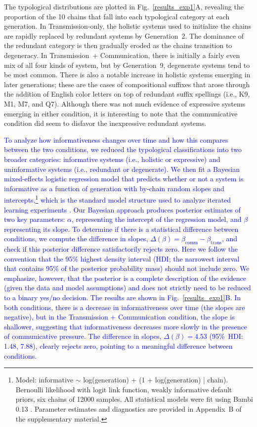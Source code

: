 \documentclass[doc,biblatex]{apa7}
\newcommand\newmaterial[1]{\textcolor{blue}{#1}}
\begin{document}
The typological distributions are plotted in Fig.~\ref{results_exp1}A, revealing the proportion of the 10 chains that fall into each typological category at each generation. In Transmission-only, the holistic systems used to initialize the chains are rapidly replaced by redundant systems by Generation~2. The dominance of the redundant category is then gradually eroded as the chains transition to degeneracy. In Transmission~+ Communication, there is initially a fairly even mix of all four kinds of system, but by Generation~9, degenerate systems tend to be most common. There is also a notable increase in holistic systems emerging in later generations; these are the cases of compositional suffixes that arose through the addition of English color letters on top of redundant suffix spellings (i.e., K9, M1, M7, and Q7). Although there was not much evidence of expressive systems emerging in either condition, it is interesting to note that the communicative condition did seem to disfavor the inexpressive redundant systems.

\newmaterial{To analyze how informativeness changes over time and how this compares between the two conditions, we reduced the typological classifications into two broader categories: informative systems (i.e., holistic or expressive) and uninformative systems (i.e., redundant or degenerate). We then fit a Bayesian mixed-effects logistic regression model that predicts whether or not a system is informative as a function of generation with by-chain random slopes and intercepts,\footnote{Model: informative $\sim$ log(generation) + (1 + log(generation) | chain). Bernoulli likelihood with logit link function, weakly informative default priors, six chains of 12000 samples. All statistical models were fit using Bambi 0.13 \parencite{Capretto:2022}. Parameter estimates and diagnostics are provided in Appendix~B of the supplementary material.} which is the standard model structure used to analyze iterated learning experiments \parencite{Winter:2016}. Our Bayesian approach produces posterior estimates of two key parameters: $\alpha$, representing the intercept of the regression model, and $\beta$ representing its slope. To determine if there is a statistical difference between conditions, we compute the difference in slopes, $\Delta(\beta) = \beta_\mathrm{comm} - \beta_\mathrm{trans}$, and check if this posterior difference satisfactorily rejects zero. Here we follow the convention that the 95\% highest density interval (HDI; the narrowest interval that contains 95\% of the posterior probability mass) should not include zero. We emphasize, however, that the posterior is a complete description of the evidence (given the data and model assumptions) and does not strictly need to be reduced to a binary yes/no decision. The results are shown in Fig.~\ref{results_exp1}B. In both conditions, there is a decrease in informativeness over time (the slopes are negative), but in the Transmission + Communication condition, the slope is shallower, suggesting that informativeness decreases more slowly in the presence of communicative pressure. The difference in slopes, $\Delta(\beta) = 4.53$ (95\%~HDI: 1.48, 7.88), clearly rejects zero, pointing to a meaningful difference between conditions.}
\end{document}
